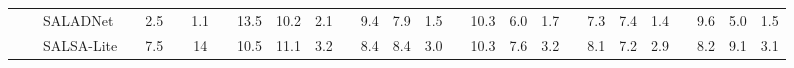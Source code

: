 \documentclass[lettersize,journal]{IEEEtran}
\begin{document}
\begin{table}[]
\begin{tabular}{lcllclccccccccccccccccccccc}
                          &                                                                                  & SALADNet\cite{Grumiaux2021SaladnetSM}                             &  & 2.5                                                                        &  & 1.1                                                                           &  &13.5                                                        &10.2                                                        &2.1                                                       &  &9.4                                                        &7.9                                                        &1.5                                                       &  &10.3                                                        &6.0                                                        &1.7                                                       &  &7.3                                                        &7.4                                                        &1.4                                                       &  &9.6                                                        &5.0                                                        &1.5                                                       \\
                          &                                                                                  & SALSA-Lite\cite{Nguyen2021SALSALiteAF}                          &  & 7.5                                                                        &  & 14                                                                            &  & 10.5                                                   & 11.1                                                   & 3.2                                                   &  & 8.4                                                    & 8.4                                                    & 3.0                                                   &  & 10.3                                                   & 7.6                                                    & 3.2                                                   &  & 8.1                                                    & 7.2                                                    & 2.9                                                   &  & 8.2                                                    & 9.1                                                    & 3.1                                                   \\

\end{tabular}
\end{table}
\end{document}
